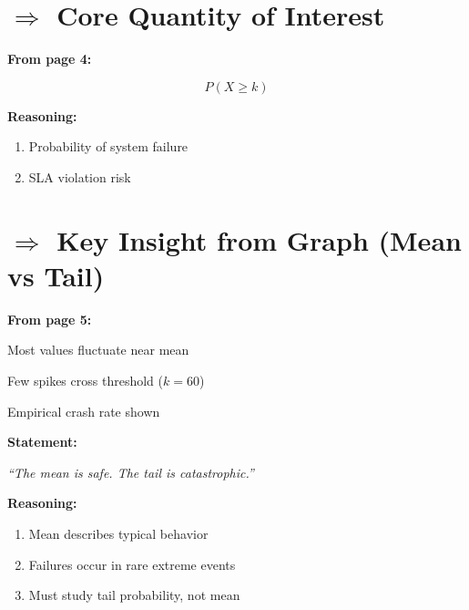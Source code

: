 \documentclass{article}
\begin{document}
\section*{$\Rightarrow$ Core Quantity of Interest}

\textbf{From page 4:}

\[
P(X \ge k)
\]

\vspace{0.2cm}

\textbf{Reasoning:}

\begin{enumerate}
\item Probability of system failure
\item SLA violation risk
\end{enumerate}

\vspace{0.6cm}


\section*{$\Rightarrow$ Key Insight from Graph (Mean vs Tail)}

\textbf{From page 5:}

Most values fluctuate near mean  

Few spikes cross threshold ($k = 60$)  

Empirical crash rate shown  

\vspace{0.2cm}

\textbf{Statement:}

\begin{center}
\textit{``The mean is safe. The tail is catastrophic.''}
\end{center}

\vspace{0.2cm}

\textbf{Reasoning:}

\begin{enumerate}
\item Mean describes typical behavior
\item Failures occur in rare extreme events
\item Must study tail probability, not mean
\end{enumerate}

\vspace{0.6cm}

\end{document}

